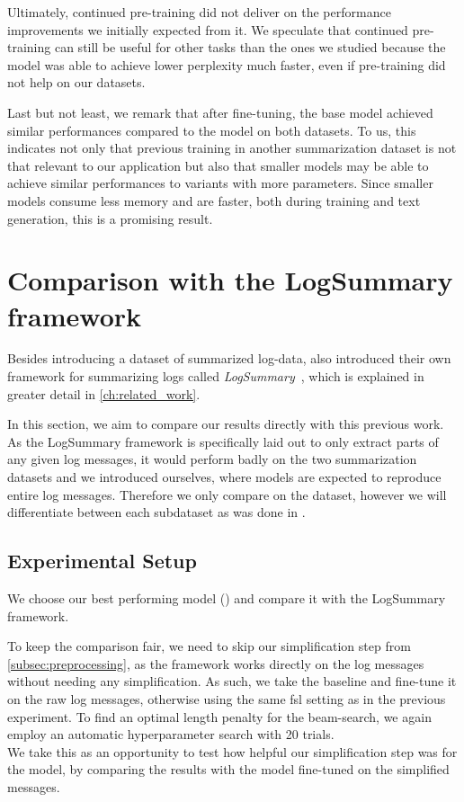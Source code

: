 Ultimately, continued pre-training did not deliver on the performance improvements we initially expected from it.
We speculate that continued pre-training can still be useful for other tasks than the ones we studied
because the model was able to achieve lower perplexity much faster, even if pre-training did not help on our datasets.

Last but not least,
we remark that after fine-tuning, the base model achieved similar performances compared to the  model on both datasets.
To us, this indicates not only that previous training in another summarization dataset is not that relevant to our application
but also that smaller models may be able to achieve similar performances to variants with more parameters.
Since smaller models consume less memory and are faster, both during training and text generation, this is a promising result.

\section{Comparison with the LogSummary framework}\label{sec:evaluation_experiment_logsummary}

Besides introducing a dataset of summarized log-data,
\citeauthor*{log_summary} also introduced their own framework for summarizing logs called \emph{LogSummary}~\parencite{log_summary},
which is explained in greater detail in \autoref{ch:related_work}.

In this section, we aim to compare our results directly with this previous work.
As the LogSummary framework is specifically laid out to only extract parts of any given log messages,
it would perform badly on the two summarization datasets \hadoop{} and \telco{} we introduced ourselves,
where models are expected to reproduce entire log messages.
Therefore we only compare on the \logsummary{} dataset, however we will differentiate between each subdataset as was done in \parencite{log_summary}.

\subsection{Experimental Setup}

We choose our best performing model () and compare it with the LogSummary framework.

To keep the comparison fair, we need to skip our simplification step from \autoref{subsec:preprocessing},
as the framework works directly on the log messages without needing any simplification.
As such, we take the baseline  and fine-tune it on the raw log messages,
otherwise using the same \ac{fsl} setting as in the previous experiment.
To find an optimal length penalty for the beam-search, we again employ an automatic hyperparameter search with 20 trials.\\
We take this as an opportunity to test how helpful our simplification step was for the model,
by comparing the results with the  model fine-tuned on the simplified messages.

